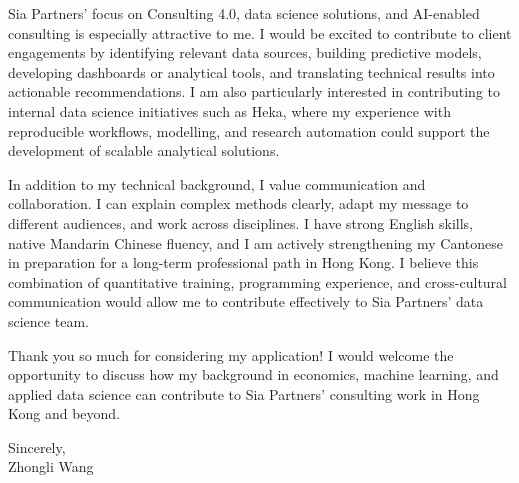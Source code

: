 \documentclass[11pt]{article}
\begin{document}
Sia Partners' focus on Consulting 4.0, data science solutions, and AI-enabled consulting is especially attractive to me. I would be excited to contribute to client engagements by identifying relevant data sources, building predictive models, developing dashboards or analytical tools, and translating technical results into actionable recommendations. I am also particularly interested in contributing to internal data science initiatives such as Heka, where my experience with reproducible workflows, modelling, and research automation could support the development of scalable analytical solutions.

In addition to my technical background, I value communication and collaboration. I can explain complex methods clearly, adapt my message to different audiences, and work across disciplines. I have strong English skills, native Mandarin Chinese fluency, and I am actively strengthening my Cantonese in preparation for a long-term professional path in Hong Kong. I believe this combination of quantitative training, programming experience, and cross-cultural communication would allow me to contribute effectively to Sia Partners' data science team.

Thank you so much for considering my application! I would welcome the opportunity to discuss how my background in economics, machine learning, and applied data science can contribute to Sia Partners' consulting work in Hong Kong and beyond.

\vspace{0.15cm}

\noindent Sincerely, \\[0.6cm]
\noindent Zhongli Wang
\end{document}
